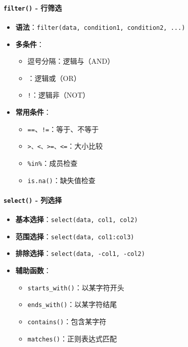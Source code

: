\documentclass[
]{book}
\providecommand{\tightlist}{%
  \setlength{\itemsep}{0pt}\setlength{\parskip}{0pt}}
\begin{document}
\hypertarget{filter---ux884cux7b5bux9009}{%
\paragraph{\texorpdfstring{\texttt{filter()} - 行筛选}{filter() - 行筛选}}\label{filter---ux884cux7b5bux9009}}

\begin{itemize}
\tightlist
\item
  \textbf{语法}：\texttt{filter(data,\ condition1,\ condition2,\ ...)}
\item
  \textbf{多条件}：

  \begin{itemize}
  \tightlist
  \item
    逗号分隔：逻辑与（AND）
  \item
    \texttt{\textbar{}}：逻辑或（OR）
  \item
    \texttt{!}：逻辑非（NOT）
  \end{itemize}
\item
  \textbf{常用条件}：

  \begin{itemize}
  \tightlist
  \item
    \texttt{==}、\texttt{!=}：等于、不等于
  \item
    \texttt{\textgreater{}、\textless{}、\textgreater{}=、\textless{}=}：大小比较
  \item
    \texttt{\%in\%}：成员检查
  \item
    \texttt{is.na()}：缺失值检查
  \end{itemize}
\end{itemize}

\hypertarget{select---ux5217ux9009ux62e9}{%
\paragraph{\texorpdfstring{\texttt{select()} - 列选择}{select() - 列选择}}\label{select---ux5217ux9009ux62e9}}

\begin{itemize}
\tightlist
\item
  \textbf{基本选择}：\texttt{select(data,\ col1,\ col2)}
\item
  \textbf{范围选择}：\texttt{select(data,\ col1:col3)}
\item
  \textbf{排除选择}：\texttt{select(data,\ -col1,\ -col2)}
\item
  \textbf{辅助函数}：

  \begin{itemize}
  \tightlist
  \item
    \texttt{starts\_with()}：以某字符开头
  \item
    \texttt{ends\_with()}：以某字符结尾
  \item
    \texttt{contains()}：包含某字符
  \item
    \texttt{matches()}：正则表达式匹配
  \end{itemize}
\end{itemize}
\end{document}
